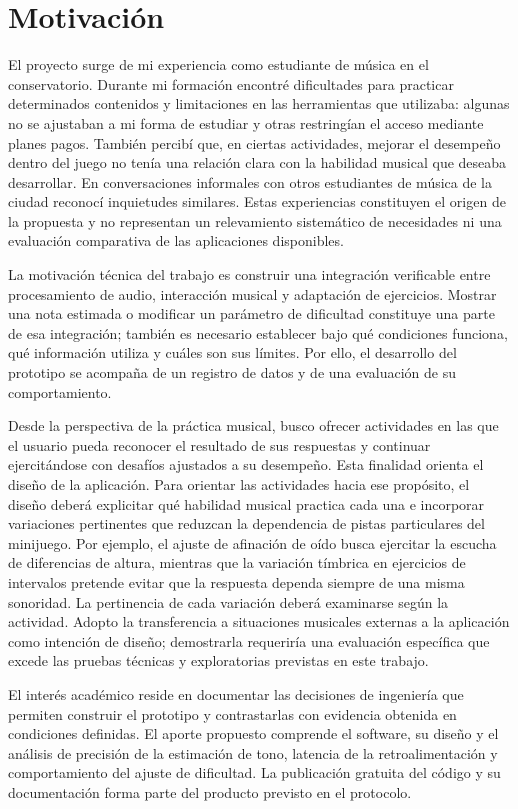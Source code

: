\section{Motivación}
El proyecto surge de mi experiencia como estudiante de música en el
conservatorio. Durante mi formación encontré dificultades para practicar determinados
contenidos y limitaciones en las herramientas que utilizaba: algunas no se ajustaban
a mi forma de estudiar y otras restringían el acceso mediante planes pagos. También
percibí que, en ciertas actividades, mejorar el desempeño dentro del juego no tenía
una relación clara con la habilidad musical que deseaba desarrollar. En conversaciones
informales con otros estudiantes de música de la ciudad reconocí
inquietudes similares. Estas experiencias constituyen el origen de la propuesta y
no representan un relevamiento sistemático de necesidades ni una evaluación comparativa
de las aplicaciones disponibles.

La motivación técnica del trabajo es construir una integración verificable entre
procesamiento de audio, interacción musical y adaptación de ejercicios. Mostrar una nota
estimada o modificar un parámetro de dificultad constituye una parte de esa integración;
también es necesario establecer bajo qué condiciones funciona, qué información utiliza
y cuáles son sus límites. Por ello, el desarrollo del prototipo se acompaña de un registro
de datos y de una evaluación de su comportamiento.

Desde la perspectiva de la práctica musical, busco ofrecer actividades en las que el
usuario pueda reconocer el resultado de sus respuestas y continuar ejercitándose con
desafíos ajustados a su desempeño. Esta finalidad orienta el diseño de la aplicación.
Para orientar las actividades hacia ese propósito, el diseño deberá explicitar qué
habilidad musical practica cada una e incorporar variaciones pertinentes que reduzcan
la dependencia de pistas particulares del minijuego. Por ejemplo, el ajuste de afinación
de oído busca ejercitar la escucha de diferencias de altura, mientras que la variación
tímbrica en ejercicios de intervalos pretende evitar que la respuesta dependa siempre
de una misma sonoridad. La pertinencia de cada variación deberá examinarse según la
actividad. Adopto la transferencia a situaciones musicales externas a la aplicación
como intención de diseño; demostrarla requeriría una evaluación específica que excede
las pruebas técnicas y exploratorias previstas en este trabajo.

El interés académico reside en documentar las decisiones de ingeniería que permiten
construir el prototipo y contrastarlas con evidencia obtenida en condiciones definidas.
El aporte propuesto comprende el software, su diseño y el análisis de precisión de la
estimación de tono, latencia de la retroalimentación y comportamiento del ajuste de
dificultad. La publicación gratuita del código y su documentación forma parte del
producto previsto en el protocolo.
